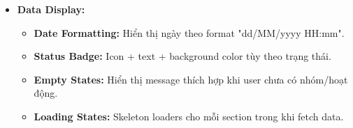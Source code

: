 \begin{itemize}
\begin{itemize}
            \item \texttt{userId}: ID người dùng được truyền từ navigation params.
            \item \texttt{useUser(userId)}: React Query hook fetch chi tiết người dùng.
            \item \texttt{useUserGroups(userId)}: Fetch danh sách nhóm của user.
            \item \texttt{useUserActivity(userId)}: Fetch thống kê hoạt động.
            \item \texttt{useUserHistory(userId)}: Fetch lịch sử tài khoản.
            \item \texttt{dialogState}: Object chứa state của các dialog (visible, type, data).
            \item \texttt{reason}: String lưu lý do khóa/mở khóa tài khoản.
        \end{itemize}
    \item \textbf{Data Display:}
        \begin{itemize}
            \item \textbf{Date Formatting:} Hiển thị ngày theo format "dd/MM/yyyy HH:mm".
            \item \textbf{Status Badge:} Icon + text + background color tùy theo trạng thái.
            \item \textbf{Empty States:} Hiển thị message thích hợp khi user chưa có nhóm/hoạt động.
            \item \textbf{Loading States:} Skeleton loaders cho mỗi section trong khi fetch data.
        \end{itemize}
\end{itemize}

